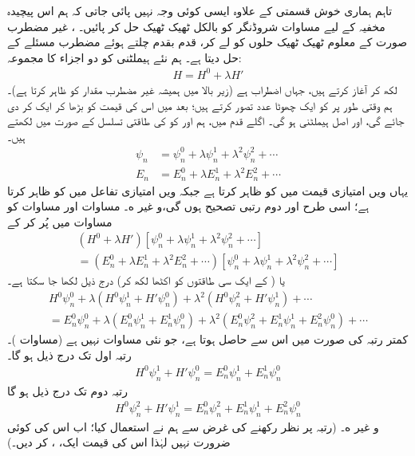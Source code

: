 تاہم ہماری خوش قسمتی کے علاوہ ایسی کوئی وجہ نہیں پائی جاتی کہ ہم اس پیچیدہ مخفیہ کے لیے مساوات شروڈنگر کو بالکل ٹھیک ٹھیک حل کر پائیں۔ ، غیر مضطرب صورت کے معلوم ٹھیک ٹھیک حلوں کو لے کر، قدم بقدم چلتے ہوئے مضطرب مسئلے کے  حل دیتا ہے۔ ہم نئے ہیملٹنی کو دو اجزاء کا مجموعہ:
\begin{align}
H = H^0 + \lambda H'
\end{align}
 لکھ کر آغاز کرتے ہیں، جہاں  اضطراب ہے (زیر بالا میں  ہمیشہ غیر مضطرب مقدار کو ظاہر کرتا ہے)۔ ہم وقتی طور پر  کو ایک چھوٹا عدد تصور کرتے ہیں؛ بعد میں اس کی قیمت کو بڑھا کر ایک  کر دی جائے گی، اور  اصل ہیملٹنی ہو گی۔ اگلے قدم میں، ہم  اور  کو  کی طاقتی تسلسل کے صورت میں لکھتے ہیں۔
\begin{align}
\psi_n &= \psi_n^0 + \lambda\psi_n^1 + \lambda^2\psi_n^2+\cdots \label{مساوات_اضطراب_سائے_این}\\
E_n &= E_n^0 + \lambda E_n^1 + \lambda^2 E_n^2+\cdots \label{مساوات_اضطراب_ای_این}
\end{align} 
یہاں  ویں امتیازی  قیمت میں  کو  ظاہر کرتا ہے جبکہ  ویں امتیازی تفاعل میں  کو  ظاہر کرتا ہے؛ اسی طرح  اور  دوم رتبی تصحیح ہوں گی،و غیر ه۔ مساوات  اور مساوات  کو مساوات  میں پُر کر کے 
\begin{multline*}
(H^0 + \lambda H')[\psi_n^0 + \lambda \psi_n^1 + \lambda^2 \psi_n^2 + \cdots]\\
= (E_n^0 + \lambda E_n^1 + \lambda^2 E_n^2 + \cdots)[\psi_n^0 + \lambda \psi_n^1 + \lambda^2 \psi_n^2 + \cdots]
\end{multline*}
یا (  کے ایک سی طاقتوں کو اکٹھا لکھ کر) درج ذیل لکھا جا سکتا ہے۔
\begin{multline*}
H^0 \psi_n^0 + \lambda (H^0 \psi_n^1 + H' \psi_n^0) + \lambda^2 (H^0 \psi_n^2 + H' \psi_n^1) + \cdots \\
= E_n^0 \psi_n^0 + \lambda (E_n^0 \psi_n^1 + E_n^1 \psi_n^0) + \lambda^2 (E_n^0 \psi_n^2 + E_n^1 \psi_n^1 + E_n^2 \psi_n^0) + \cdots
\end{multline*}
 کمتر رتبہ  کی صورت میں اس سے  حاصل ہوتا ہے، جو نئی مساوات نہیں ہے (مساوات )۔ رتبہ اول  تک درج ذیل ہو گا۔
\begin{align}\label{مساوات_اضطراب_رتبہ_اول}
H^0 \psi_n^1 + H' \psi_n^0 = E_n^0 \psi_n^1 + E_n^1 \psi_n^0
\end{align}
رتبہ دوم  تک درج ذیل ہو گا 
\begin{align}\label{مساوات_اضطراب_رتبہ_دوم}
H^0 \psi_n^2 + H' \psi_n^1 = E_n^0 \psi_n^2 + E_n^1 \psi_n^1 + E_n^2 \psi_n^0
\end{align}
و غیر ه۔ (رتبہ پر نظر رکھنے کی غرض سے ہم نے  استعمال کیا؛ اب اس کی کوئی ضرورت نہیں لہٰذا اس کی قیمت ایک، ، کر دیں۔)


